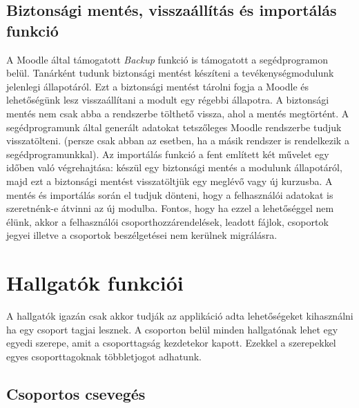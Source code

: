\subsection{Biztonsági mentés, visszaállítás és importálás funkció}

A Moodle által támogatott \textit{Backup} funkció is támogatott a segédprogramon belül. Tanárként tudunk biztonsági mentést készíteni a tevékenységmodulunk jelenlegi állapotáról. Ezt a biztonsági mentést tárolni fogja a Moodle és lehetőségünk lesz visszaállítani a modult egy régebbi állapotra. A biztonsági mentés nem csak abba a rendszerbe tölthető vissza, ahol a mentés megtörtént. A segédprogramunk által generált adatokat tetszőleges Moodle rendszerbe tudjuk visszatölteni. (persze csak abban az esetben, ha a másik rendszer is rendelkezik a segédprogramunkkal). Az importálás funkció a fent említett két művelet egy időben való végrehajtása: készül egy biztonsági mentés a modulunk állapotáról, majd ezt a biztonsági mentést visszatöltjük egy meglévő vagy új kurzusba. A mentés és importálás során el tudjuk dönteni, hogy a felhasználói adatokat is szeretnénk-e átvinni az új modulba. Fontos, hogy ha ezzel a lehetőséggel nem élünk, akkor a felhasználói csoporthozzárendelések, leadott fájlok, csoportok jegyei illetve a csoportok beszélgetései nem kerülnek migrálásra. 

\section{Hallgatók funkciói}

A hallgatók igazán csak akkor tudják az applikáció adta lehetőségeket kihasználni ha egy csoport tagjai lesznek. A csoporton belül minden hallgatónak lehet egy egyedi szerepe, amit a csoporttagság kezdetekor kapott. Ezekkel a szerepekkel egyes csoporttagoknak többletjogot adhatunk.

\subsection{Csoportos csevegés}

